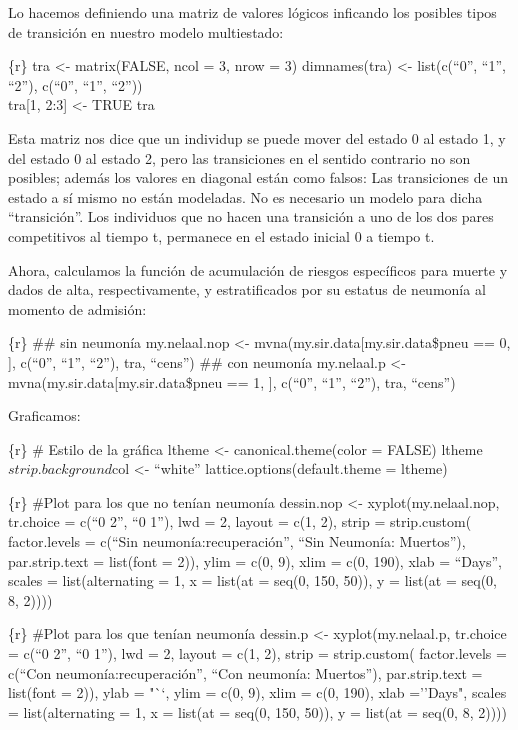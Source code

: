 \documentclass[
]{article}
\begin{document}
Lo hacemos definiendo una matriz de valores lógicos inficando los
posibles tipos de transición en nuestro modelo multiestado:

\{r\} tra \textless- matrix(FALSE, ncol = 3, nrow = 3) dimnames(tra)
\textless- list(c(``0'', ``1'', ``2''), c(``0'', ``1'', ``2''))\\
tra{[}1, 2:3{]} \textless- TRUE tra

Esta matriz nos dice que un individup se puede mover del estado 0 al
estado 1, y del estado 0 al estado 2, pero las transiciones en el
sentido contrario no son posibles; además los valores en diagonal están
como falsos: Las transiciones de un estado a sí mismo no están
modeladas. No es necesario un modelo para dicha ``transición''. Los
individuos que no hacen una transición a uno de los dos pares
competitivos al tiempo t, permanece en el estado inicial 0 a tiempo t.

Ahora, calculamos la función de acumulación de riesgos específicos para
muerte y dados de alta, respectivamente, y estratificados por su estatus
de neumonía al momento de admisión:

\{r\} \#\# sin neumonía my.nelaal.nop \textless-
mvna(my.sir.data{[}my.sir.data\$pneu == 0, {]}, c(``0'', ``1'', ``2''),
tra, ``cens'') \#\# con neumonía my.nelaal.p \textless-
mvna(my.sir.data{[}my.sir.data\$pneu == 1, {]}, c(``0'', ``1'', ``2''),
tra, ``cens'')

Graficamos:

\{r\} \# Estilo de la gráfica ltheme \textless- canonical.theme(color =
FALSE) ltheme\(strip.background\)col \textless- ``white''
lattice.options(default.theme = ltheme)

\{r\} \#Plot para los que no tenían neumonía dessin.nop \textless-
xyplot(my.nelaal.nop, tr.choice = c(``0 2'', ``0 1''), lwd = 2, layout =
c(1, 2), strip = strip.custom( factor.levels = c(``Sin
neumonía:recuperación'', ``Sin Neumonía: Muertos''), par.strip.text =
list(font = 2)), ylim = c(0, 9), xlim = c(0, 190), xlab = ``Days'',
scales = list(alternating = 1, x = list(at = seq(0, 150, 50)), y =
list(at = seq(0, 8, 2))))

\{r\} \#Plot para los que tenían neumonía dessin.p \textless-
xyplot(my.nelaal.p, tr.choice = c(``0 2'', ``0 1''), lwd = 2, layout =
c(1, 2), strip = strip.custom( factor.levels = c(``Con
neumonía:recuperación'', ``Con neumonía: Muertos''), par.strip.text =
list(font = 2)), ylab = "``, ylim = c(0, 9), xlim = c(0, 190), xlab
=''Days", scales = list(alternating = 1, x = list(at = seq(0, 150, 50)),
y = list(at = seq(0, 8, 2))))
\end{document}
